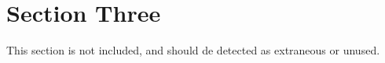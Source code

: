 \section{Section Three}
This section is not included, and should de detected as extraneous or
unused.

\lipsum[1] %
